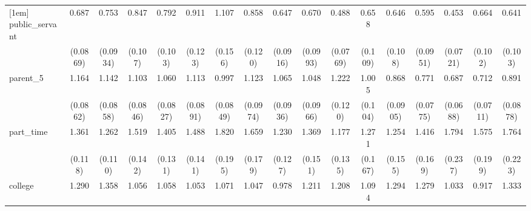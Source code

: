 {\begin{tabular}{l*{16}{c}}
[1em]
public\_servant      &       0.687\sym{**} &       0.753\sym{*}  &       0.847         &       0.792         &       0.911         &       1.107         &       0.858         &       0.647\sym{**} &       0.670\sym{**} &       0.488\sym{***}&       0.658\sym{*}  &       0.646\sym{**} &       0.595\sym{**} &       0.453\sym{***}&       0.664\sym{**} &       0.641\sym{**} \\
                    &    (0.0869)         &    (0.0934)         &     (0.107)         &     (0.103)         &     (0.123)         &     (0.156)         &     (0.120)         &    (0.0916)         &    (0.0993)         &    (0.0769)         &     (0.109)         &     (0.108)         &    (0.0951)         &    (0.0721)         &     (0.102)         &     (0.103)         \\
[1em]
parent\_5            &       1.164\sym{*}  &       1.142         &       1.103         &       1.060         &       1.113         &       0.997         &       1.123         &       1.065         &       1.048         &       1.222\sym{*}  &       1.005         &       0.868         &       0.771\sym{**} &       0.687\sym{***}&       0.712\sym{***}&       0.891         \\
                    &    (0.0862)         &    (0.0858)         &    (0.0846)         &    (0.0827)         &    (0.0891)         &    (0.0849)         &    (0.0974)         &    (0.0936)         &    (0.0966)         &     (0.120)         &     (0.104)         &    (0.0905)         &    (0.0775)         &    (0.0688)         &    (0.0711)         &    (0.0878)         \\
[1em]
part\_time           &       1.361\sym{***}&       1.262\sym{**} &       1.519\sym{***}&       1.405\sym{***}&       1.488\sym{***}&       1.820\sym{***}&       1.659\sym{***}&       1.230\sym{*}  &       1.369\sym{**} &       1.177         &       1.271         &       1.254         &       1.416\sym{**} &       1.794\sym{***}&       1.575\sym{***}&       1.764\sym{***}\\
                    &     (0.118)         &     (0.110)         &     (0.142)         &     (0.131)         &     (0.141)         &     (0.195)         &     (0.179)         &     (0.127)         &     (0.151)         &     (0.135)         &     (0.167)         &     (0.155)         &     (0.169)         &     (0.237)         &     (0.199)         &     (0.223)         \\
[1em]
college             &       1.290\sym{**} &       1.358\sym{**} &       1.056         &       1.058         &       1.053         &       1.071         &       1.047         &       0.978         &       1.211         &       1.208         &       1.094         &       1.294\sym{*}  &       1.279         &       1.033         &       0.917         &       1.333\sym{*}  \\

\end{tabular}}
